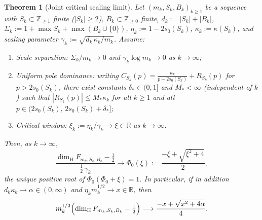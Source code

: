 \documentclass[11pt]{article}
\newtheorem{theorem}{Theorem}[section]
\theoremstyle{definition}
\theoremstyle{remark}
\newcommand{\R}{\mathbb{R}}
\newcommand{\Z}{\mathbb{Z}}
\newcommand{\dimH}{\dim_{\mathrm{H}}}
\begin{document}
\begin{theorem}[Joint critical scaling limit]\label{thm:critical-scaling}
Let $(m_k,S_k,B_k)_{k\ge1}$ be a sequence with $S_k\subset\Z_{\ge1}$ finite
($|S_k|\ge2$), $B_k\subset\Z_{\ge0}$ finite, $d_k:=|S_k|+|B_k|$,
$\Sigma_k:=1+\max S_k+\max(B_k\cup\{0\})$, $\eta_k:=1-2s_0(S_k)$,
$\kappa_k:=\kappa(S_k)$, and scaling parameter
$\gamma_k:=\sqrt{d_k\,\kappa_k/m_k}$. Assume:
\begin{enumerate}[label=\textup{(H\arabic*)},leftmargin=2.4em]
\item \emph{Scale separation:} $\Sigma_k/m_k\to0$ and $\gamma_k\log m_k\to0$
as $k\to\infty$;
\item \emph{Uniform pole dominance:} writing
$C_{S_k}(p)=\frac{\kappa_k}{p-2s_0(S_k)}+R_{S_k}(p)$ for $p>2s_0(S_k)$, there
exist constants $\delta_*\in(0,1]$ and $M_*<\infty$ (independent of $k$) such
that $|R_{S_k}(p)|\le M_*\kappa_k$ for all $k\ge1$ and all
$p\in(2s_0(S_k),\,2s_0(S_k)+\delta_*]$;
\item \emph{Critical window:} $\xi_k:=\eta_k/\gamma_k\to\xi\in\R$ as
$k\to\infty$.
\end{enumerate}
Then, as $k\to\infty$,
\begin{equation}\label{eq:scaling-universal}
\frac{\dimH F_{m_k,S_k,B_k}-\frac12}{\frac12\,\gamma_k}
\longrightarrow \Phi_0(\xi):=\frac{-\xi+\sqrt{\xi^2+4}}{2},
\end{equation}
the unique positive root of $\Phi_0(\Phi_0+\xi)=1$. In particular, if in
addition $d_k\kappa_k\to\alpha\in(0,\infty)$ and $\eta_k m_k^{1/2}\to x\in\R$,
then
\[
m_k^{1/2}\Bigl(\dimH F_{m_k,S_k,B_k}-\tfrac12\Bigr)
\longrightarrow\frac{-x+\sqrt{x^2+4\alpha}}{4}.
\]
\end{theorem}
\end{document}
